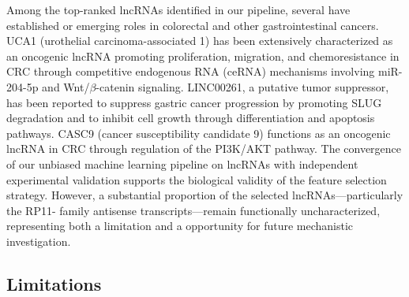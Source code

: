 \documentclass[fleqn,10pt]{wlscirep}
\begin{document}
Among the top-ranked lncRNAs identified in our pipeline, several have established or emerging roles in colorectal and other gastrointestinal cancers. UCA1 (urothelial carcinoma-associated 1) has been extensively characterized as an oncogenic lncRNA promoting proliferation, migration, and chemoresistance in CRC through competitive endogenous RNA (ceRNA) mechanisms involving miR-204-5p and Wnt/$\beta$-catenin signaling. LINC00261, a putative tumor suppressor, has been reported to suppress gastric cancer progression by promoting SLUG degradation and to inhibit cell growth through differentiation and apoptosis pathways\cite{RN25}. CASC9 (cancer susceptibility candidate 9) functions as an oncogenic lncRNA in CRC through regulation of the PI3K/AKT pathway. The convergence of our unbiased machine learning pipeline on lncRNAs with independent experimental validation supports the biological validity of the feature selection strategy. However, a substantial proportion of the selected lncRNAs—particularly the RP11- family antisense transcripts—remain functionally uncharacterized, representing both a limitation and a opportunity for future mechanistic investigation.

\subsection*{Limitations}
\end{document}
